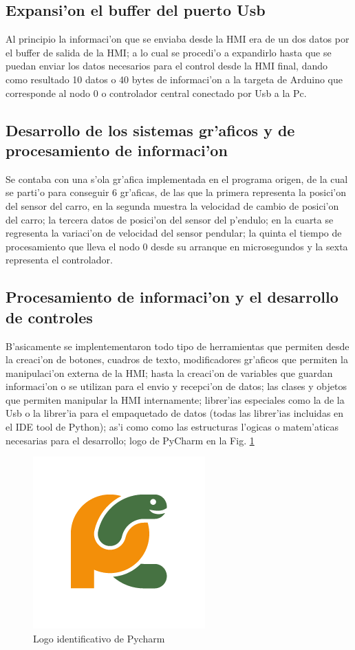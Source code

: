 \subsection{Expansi'on el buffer del puerto Usb}

Al principio la informaci'on que se enviaba desde la HMI era de un dos datos por el buffer de salida de la HMI; a lo cual se procedi'o a expandirlo hasta que se puedan enviar los datos necesarios para el control desde la HMI final, dando como resultado 10 datos o 40 bytes de informaci'on a la targeta de Arduino que corresponde al nodo 0 o controlador central conectado por Usb a la Pc.


\subsection{Desarrollo de los sistemas gr'aficos y de procesamiento de informaci'on }
Se contaba con una s'ola gr'afica implementada en el programa origen, de la cual se parti'o para conseguir 6 gr'aficas, de las que la primera representa la posici'on del sensor del carro, en la segunda muestra la velocidad de cambio de posici'on del carro; la tercera datos de posici'on del sensor del p'endulo; en la cuarta se regresenta la variaci'on de velocidad del sensor pendular; la quinta el tiempo de procesamiento que lleva el nodo 0 desde su arranque en microsegundos y la sexta representa el controlador.

\subsection{Procesamiento de informaci'on y el desarrollo de controles}

B'asicamente se implentementaron todo tipo de herramientas que permiten desde la creaci'on de botones, cuadros de texto, modificadores gr'aficos  que permiten la manipulaci'on externa de la HMI; hasta la creaci'on de variables que guardan informaci'on o se utilizan para el envio y recepci'on de datos; las clases y objetos que permiten manipular la HMI internamente; librer'ias especiales como la de la Usb o la librer'ia para el empaquetado de datos (todas las librer'ias incluidas en el IDE tool de Python); as'i como como las estructuras l'ogicas o matem'aticas necesarias para el desarrollo; logo de PyCharm en la Fig. \ref{fig:pycharm}
\begin{figure}[ht]
	\centering
		\includegraphics[scale=0.4]{pycharm}
	\caption{Logo identificativo de Pycharm}
	\label{fig:pycharm}
\end{figure}


